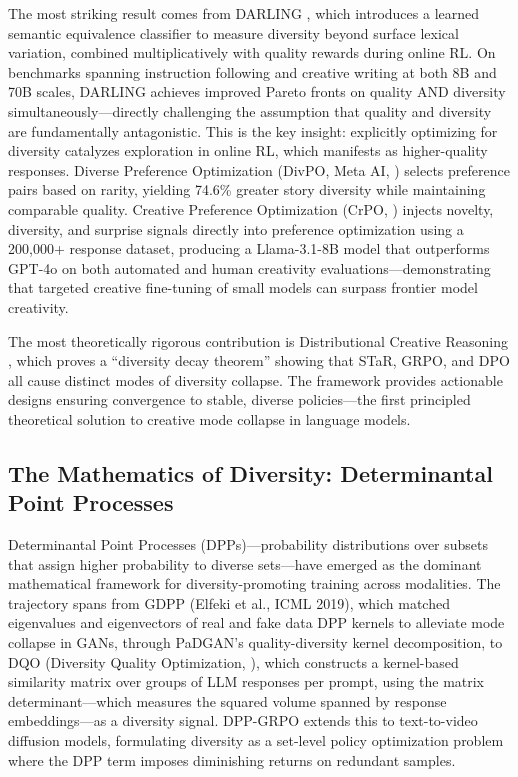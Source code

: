 \documentclass[12pt,a4paper]{article}
\begin{document}
The most striking result comes from DARLING \citep{li2025darling}, which introduces a learned semantic equivalence classifier to measure diversity beyond surface lexical variation, combined multiplicatively with quality rewards during online RL. On benchmarks spanning instruction following and creative writing at both 8B and 70B scales, DARLING achieves improved Pareto fronts on quality AND diversity simultaneously---directly challenging the assumption that quality and diversity are fundamentally antagonistic. This is the key insight: explicitly optimizing for diversity catalyzes exploration in online RL, which manifests as higher-quality responses. Diverse Preference Optimization (DivPO, Meta AI, \citealt{lanchantin2025}) selects preference pairs based on rarity, yielding 74.6\% greater story diversity while maintaining comparable quality. Creative Preference Optimization (CrPO, \citealt{ismayilzada2025}) injects novelty, diversity, and surprise signals directly into preference optimization using a 200,000+ response dataset, producing a Llama-3.1-8B model that outperforms GPT-4o on both automated and human creativity evaluations---demonstrating that targeted creative fine-tuning of small models can surpass frontier model creativity.

The most theoretically rigorous contribution is Distributional Creative Reasoning \citep{ruizluyten2026}, which proves a ``diversity decay theorem'' showing that STaR, GRPO, and DPO all cause distinct modes of diversity collapse. The framework provides actionable designs ensuring convergence to stable, diverse policies---the first principled theoretical solution to creative mode collapse in language models.

\subsection{The Mathematics of Diversity: Determinantal Point Processes}
Determinantal Point Processes (DPPs)---probability distributions over subsets that assign higher probability to diverse sets---have emerged as the dominant mathematical framework for diversity-promoting training across modalities. The trajectory spans from GDPP (Elfeki et al., ICML 2019), which matched eigenvalues and eigenvectors of real and fake data DPP kernels to alleviate mode collapse in GANs, through PaDGAN's quality-diversity kernel decomposition, to DQO (Diversity Quality Optimization, \citealt{shypula2025}), which constructs a kernel-based similarity matrix over groups of LLM responses per prompt, using the matrix determinant---which measures the squared volume spanned by response embeddings---as a diversity signal. DPP-GRPO \citep{kazimi2025} extends this to text-to-video diffusion models, formulating diversity as a set-level policy optimization problem where the DPP term imposes diminishing returns on redundant samples.
\end{document}

